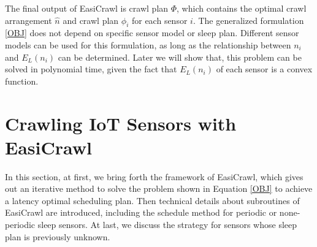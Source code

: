 \documentclass[conference]{IEEEtran}
\begin{document}
The final output of EasiCrawl is crawl plan $\Phi$, which contains the optimal crawl arrangement $\hat{n}$ and crawl plan $\phi_i$ for each sensor $i$.
The generalized formulation \eqref{OBJ} does not depend on specific sensor model or sleep plan. 
Different sensor models can be used for this formulation, as long as the relationship between $n_i$ and $E_L(n_i)$ can be determined.
Later we will show that, this problem can be solved in polynomial time, given the fact that $E_L(n_i)$ of each sensor is a convex function.

\section{Crawling IoT Sensors with EasiCrawl} \label{easicrawl}

In this section, at first, we bring forth the framework of EasiCrawl, which gives out an iterative method to solve the problem shown in Equation \eqref{OBJ} to achieve a latency optimal scheduling plan.
Then technical details about subroutines of EasiCrawl are introduced, including the schedule method for periodic or none-periodic sleep sensors. 
At last, we discuss the strategy for sensors whose sleep plan is previously unknown.
\end{document}
